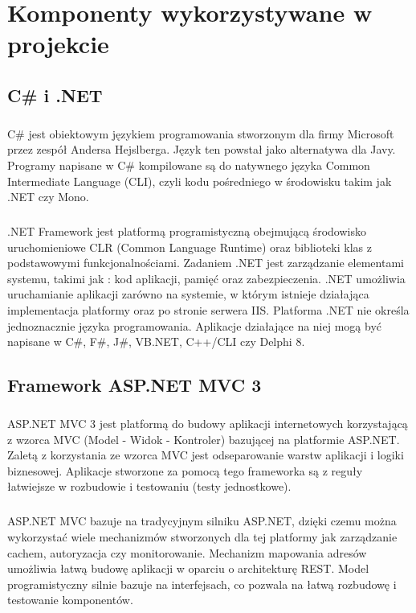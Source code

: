 \chapter{Komponenty wykorzystywane w projekcie}

\section{ C\# i .NET }
\paragraph{}
C\# jest obiektowym językiem programowania stworzonym dla firmy Microsoft przez zespół Andersa Hejslberga. Język ten powstał jako alternatywa dla Javy. Programy napisane w C\# kompilowane są do natywnego języka Common Intermediate Language (CLI), czyli kodu pośredniego w środowisku takim jak .NET czy Mono.
\paragraph{}
.NET Framework jest platformą programistyczną obejmującą środowisko uruchomieniowe CLR (Common Language Runtime) oraz biblioteki klas z podstawowymi funkcjonalnościami. Zadaniem .NET jest zarządzanie elementami systemu, takimi jak : kod aplikacji, pamięć oraz zabezpieczenia. .NET umożliwia uruchamianie aplikacji zarówno na systemie, w którym istnieje działająca implementacja platformy oraz po stronie serwera IIS. Platforma .NET nie określa jednoznacznie języka programowania. Aplikacje działające na niej mogą być napisane w C\#, F\#, J\#, VB.NET, C++/CLI czy Delphi 8. 

\section{Framework ASP.NET MVC 3}

\paragraph{}
ASP.NET MVC 3 jest platformą do budowy aplikacji internetowych korzystającą z wzorca MVC (Model - Widok - Kontroler) bazującej na platformie ASP.NET. Zaletą z korzystania ze wzorca MVC jest odseparowanie warstw aplikacji i logiki biznesowej. Aplikacje stworzone za pomocą tego frameworka są z reguły łatwiejsze w rozbudowie i testowaniu (testy jednostkowe).

\paragraph{}
ASP.NET MVC bazuje na tradycyjnym silniku ASP.NET, dzięki czemu można wykorzystać wiele mechanizmów stworzonych dla tej platformy jak zarządzanie cachem, autoryzacja czy monitorowanie. Mechanizm mapowania adresów umożliwia łatwą budowę aplikacji w oparciu o architekturę REST. Model programistyczny silnie bazuje na interfejsach, co pozwala na łatwą rozbudowę i testowanie komponentów.

